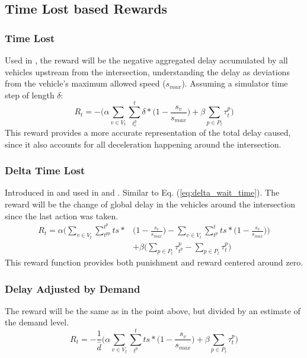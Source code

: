 \documentclass[conference]{IEEEtran}
\begin{document}
\subsection{Time Lost based Rewards}
\subsubsection{Time Lost}
Used in \cite{wan2018}, the reward will be the negative aggregated delay accumulated by all vehicles upstream from the intersection, understanding the delay as deviations from the vehicle's maximum allowed speed ($s_{max}$). 
Assuming a simulator time step of length $\delta$:
\begin{equation}
    R_t = - \bigg( \alpha \sum_{v \in V_t}  \sum_{t^p_e}^t \delta * \big( 1-\frac{s_v}{s_{max}} \big) + \beta \sum_{p \in P_t} \tau^p_t \bigg)
\label{eq:delay}
\end{equation}
This reward provides a more accurate representation of the total delay caused, since it also accounts for all deceleration happening around the intersection. 

\subsubsection{Delta Time Lost}
Introduced in \cite{abdulhai2010} and used in \cite{mannion} \cite{genders2016} \cite{gao2017} \cite{mousavi2017} and \cite{genders2018}.
Similar to Eq. (\ref{eq:delta_wait_time}).
The reward will be the change of global delay in the vehicles around the intersection since the last action was taken.
\begin{equation}
\begin{split}
R_t =  \alpha \bigg( \sum_{v \in V_t} \sum_{t^{pp}}^{t^p} ts * & \big( 1-\frac{s_v}{s_{max}} \big) - \sum_{v \in V_t}  \sum_{t^p}^t ts * \big( 1-\frac{s_v}{s_{max}} \big) \bigg) \\
& + \beta \bigg( \sum_{p \in P_t} \tau^p_{t^p} - \sum_{p \in P_t} \tau^p_{t} \bigg) 
\end{split}
\label{eq:changedelay} 
\end{equation}
This reward function provides both punishment and reward centered around zero.

\subsubsection{Delay Adjusted by Demand}
The reward will be the same as in the point above, but divided by an estimate of the demand level.
\begin{equation}
    R_t = -\frac{1}{\hat{d}} \bigg( \alpha \sum_{v\in V_t}  \sum_{t^p}^t ts * \big( 1-\frac{s_v}{s_{max}} \big) + \beta \sum_{p \in P_t} \tau^p_{t} \bigg)
\label{eq:delay}
\end{equation}
\end{document}
